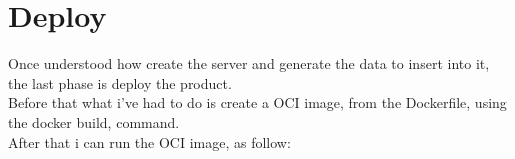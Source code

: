 \chapter{Deploy}
Once understood how create the server and generate the data to insert into it, the last phase is deploy the product.
\\ 
Before that what i've had to do is create a OCI image, from the Dockerfile, using the docker build, command.
\\
After that i can run the OCI image, as follow:

